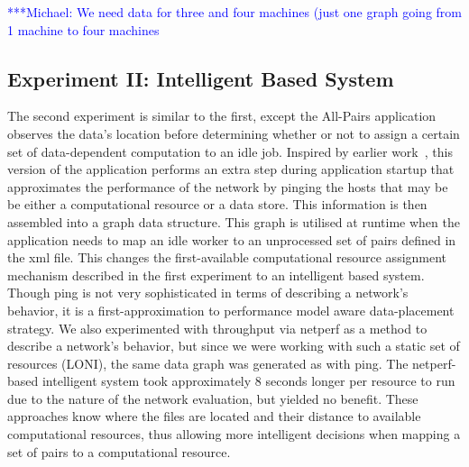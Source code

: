 \documentclass{rspublic}
\newcommand{\micnote}[1]{ {\textcolor{blue} { ***Michael: #1 }}}
\newcommand{\betynote}[1]{ {\textcolor{orange} { ***Bety: #1 }}}
\newcommand{\jhanote}[1]{} \newcommand{\micnote}[1]{}\newcommand{\betynote}[1]{} \newcommand{\fixme}[1]{}
\begin{document}
\jhanote{We need data for compute (comparison) and I/O (only) for
different data-set sizes} \micnote{We need data for three and four
machines (just one graph going from 1 machine to four machines}

\subsection{Experiment II: Intelligent Based System}
The second experiment is similar to the first, except the All-Pairs
application observes the data's location before determining whether or
not to assign a certain set of data-dependent computation to an idle
job. Inspired by earlier work~\citep{netperf}, this version of the
application performs an extra step during application startup that
approximates the performance of the network by pinging the hosts that
may be be either a computational resource or a data store. This
information is then assembled into a graph data structure. This graph
is utilised at runtime when the application needs to map an idle worker
to an unprocessed set of pairs defined in the xml file. This changes the
first-available computational resource assignment mechanism described in
the first experiment to an intelligent based system. Though ping is not
very sophisticated in terms of describing a network's behavior, it is a
first-approximation to performance model aware data-placement strategy.
We also experimented with throughput via netperf \jhanote{citation
needed} as a method to describe a network's behavior, but since we were
working with such a static set of resources (LONI), the same data graph
was generated as with ping. The netperf-based intelligent system took
approximately 8 seconds longer per resource to run due to the nature of
the network evaluation, but yielded no benefit. These approaches know
where the files are located and their distance to available
computational resources, thus allowing more intelligent decisions when
mapping a set of pairs to a computational resource.

 \jhanote{Data-aware
placement is also required, i.e., managing location of files.} 
\end{document}

